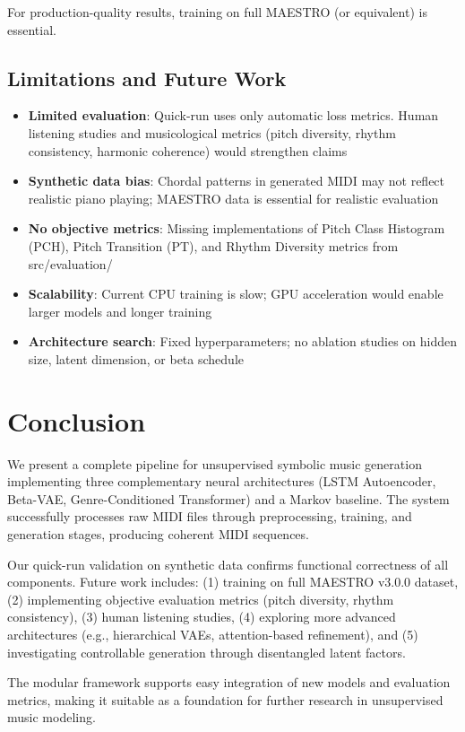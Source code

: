\documentclass[conference]{IEEEtran}
\begin{document}
For production-quality results, training on full MAESTRO (or equivalent) is essential.

\subsection{Limitations and Future Work}
\begin{itemize}
    \item \textbf{Limited evaluation}: Quick-run uses only automatic loss metrics. Human listening studies and musicological metrics (pitch diversity, rhythm consistency, harmonic coherence) would strengthen claims
    \item \textbf{Synthetic data bias}: Chordal patterns in generated MIDI may not reflect realistic piano playing; MAESTRO data is essential for realistic evaluation
    \item \textbf{No objective metrics}: Missing implementations of Pitch Class Histogram (PCH), Pitch Transition (PT), and Rhythm Diversity metrics from src/evaluation/
    \item \textbf{Scalability}: Current CPU training is slow; GPU acceleration would enable larger models and longer training
    \item \textbf{Architecture search}: Fixed hyperparameters; no ablation studies on hidden size, latent dimension, or beta schedule
\end{itemize}

\section{Conclusion}
We present a complete pipeline for unsupervised symbolic music generation implementing three complementary neural architectures (LSTM Autoencoder, Beta-VAE, Genre-Conditioned Transformer) and a Markov baseline. The system successfully processes raw MIDI files through preprocessing, training, and generation stages, producing coherent MIDI sequences. 

Our quick-run validation on synthetic data confirms functional correctness of all components. Future work includes: (1) training on full MAESTRO v3.0.0 dataset, (2) implementing objective evaluation metrics (pitch diversity, rhythm consistency), (3) human listening studies, (4) exploring more advanced architectures (e.g., hierarchical VAEs, attention-based refinement), and (5) investigating controllable generation through disentangled latent factors.

The modular framework supports easy integration of new models and evaluation metrics, making it suitable as a foundation for further research in unsupervised music modeling.
\end{document}
